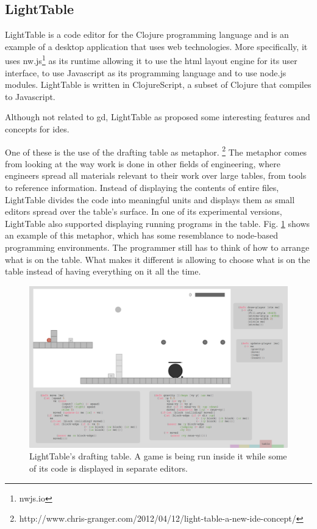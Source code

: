 \subsection{LightTable}
\label{lighttable:related}
LightTable\cite{lighttable2015site} is a code editor for the Clojure programming language\cite{hickey2008clojure} and is an example of a desktop application that uses web technologies.
More specifically, it uses nw.js\footnote{nwjs.io} as its runtime allowing it to use the html layout engine for its user interface, to use Javascript as its programming language and to use node.js\cite{tilkov2010node} modules.
LightTable is written in ClojureScript\cite{10.1109/MIC.2011.148}, a subset of Clojure that compiles to Javascript.

Although not related to \gls{gd}, LightTable as proposed some interesting features and concepts for \glspl{ide}.

One of these is the use of the drafting table as metaphor.%
\footnote{http://www.chris-granger.com/2012/04/12/light-table-a-new-ide-concept/}
The metaphor comes from looking at the way work is done in other fields of engineering, where engineers spread all materials relevant to their work over large tables, from tools to reference information.
Instead of displaying the contents of entire files, LightTable divides the code into meaningful units and displays them as small editors spread over the table's surface.
In one of its experimental versions, LightTable also supported displaying running programs in the table.
Fig. \ref{fig:lt:draft:table} shows an example of this metaphor, which has some resemblance to node-based programming environments.
The programmer still has to think of how to arrange what is on the table.
What makes it different is allowing to choose what is on the table instead of having everything on it all the time.

\begin{figure}
  \centering
  \includegraphics[width=12cm]{./images/lt_game_example__inv}
  \caption[LightTable's drafting table showing a game.]{LightTable's drafting table. A game is being run inside it while some of its code is displayed in separate editors.}
  \label{fig:lt:draft:table}
\end{figure}

